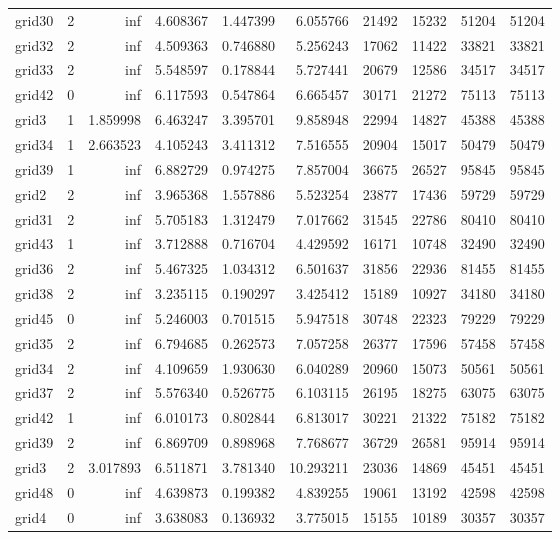 \begin{longtable}{|l|r|r|r|r|r|r|r|r|r|}
grid30 & 2 & inf & 4.608367 & 1.447399 & 6.055766 & 21492 & 15232 & 51204 & 51204 \\
grid32 & 2 & inf & 4.509363 & 0.746880 & 5.256243 & 17062 & 11422 & 33821 & 33821 \\
grid33 & 2 & inf & 5.548597 & 0.178844 & 5.727441 & 20679 & 12586 & 34517 & 34517 \\
grid42 & 0 & inf & 6.117593 & 0.547864 & 6.665457 & 30171 & 21272 & 75113 & 75113 \\
grid3 & 1 & 1.859998 & 6.463247 & 3.395701 & 9.858948 & 22994 & 14827 & 45388 & 45388 \\
grid34 & 1 & 2.663523 & 4.105243 & 3.411312 & 7.516555 & 20904 & 15017 & 50479 & 50479 \\
grid39 & 1 & inf & 6.882729 & 0.974275 & 7.857004 & 36675 & 26527 & 95845 & 95845 \\
grid2 & 2 & inf & 3.965368 & 1.557886 & 5.523254 & 23877 & 17436 & 59729 & 59729 \\
grid31 & 2 & inf & 5.705183 & 1.312479 & 7.017662 & 31545 & 22786 & 80410 & 80410 \\
grid43 & 1 & inf & 3.712888 & 0.716704 & 4.429592 & 16171 & 10748 & 32490 & 32490 \\
grid36 & 2 & inf & 5.467325 & 1.034312 & 6.501637 & 31856 & 22936 & 81455 & 81455 \\
grid38 & 2 & inf & 3.235115 & 0.190297 & 3.425412 & 15189 & 10927 & 34180 & 34180 \\
grid45 & 0 & inf & 5.246003 & 0.701515 & 5.947518 & 30748 & 22323 & 79229 & 79229 \\
grid35 & 2 & inf & 6.794685 & 0.262573 & 7.057258 & 26377 & 17596 & 57458 & 57458 \\
grid34 & 2 & inf & 4.109659 & 1.930630 & 6.040289 & 20960 & 15073 & 50561 & 50561 \\
grid37 & 2 & inf & 5.576340 & 0.526775 & 6.103115 & 26195 & 18275 & 63075 & 63075 \\
grid42 & 1 & inf & 6.010173 & 0.802844 & 6.813017 & 30221 & 21322 & 75182 & 75182 \\
grid39 & 2 & inf & 6.869709 & 0.898968 & 7.768677 & 36729 & 26581 & 95914 & 95914 \\
grid3 & 2 & 3.017893 & 6.511871 & 3.781340 & 10.293211 & 23036 & 14869 & 45451 & 45451 \\
grid48 & 0 & inf & 4.639873 & 0.199382 & 4.839255 & 19061 & 13192 & 42598 & 42598 \\
grid4 & 0 & inf & 3.638083 & 0.136932 & 3.775015 & 15155 & 10189 & 30357 & 30357 \\

\end{longtable}
